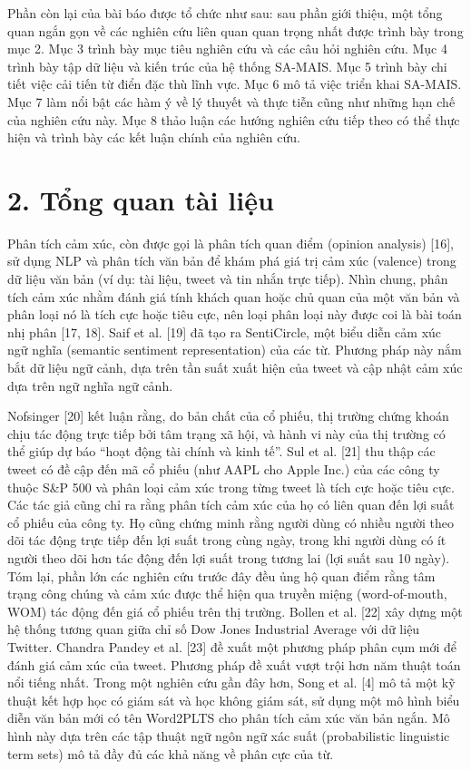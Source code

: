 Phần còn lại của bài báo được tổ chức như sau: sau phần giới thiệu, một tổng quan ngắn gọn về các nghiên cứu liên quan quan trọng nhất được trình bày trong mục 2. Mục 3 trình bày mục tiêu nghiên cứu và các câu hỏi nghiên cứu. Mục 4 trình bày tập dữ liệu và kiến trúc của hệ thống SA-MAIS. Mục 5 trình bày chi tiết việc cải tiến từ điển đặc thù lĩnh vực. Mục 6 mô tả việc triển khai SA-MAIS. Mục 7 làm nổi bật các hàm ý về lý thuyết và thực tiễn cũng như những hạn chế của nghiên cứu này. Mục 8 thảo luận các hướng nghiên cứu tiếp theo có thể thực hiện và trình bày các kết luận chính của nghiên cứu.

\section{2. Tổng quan tài liệu}

Phân tích cảm xúc, còn được gọi là phân tích quan điểm (opinion analysis) [16], sử dụng NLP và phân tích văn bản để khám phá giá trị cảm xúc (valence) trong dữ liệu văn bản (ví dụ: tài liệu, tweet và tin nhắn trực tiếp). Nhìn chung, phân tích cảm xúc nhằm đánh giá tính khách quan hoặc chủ quan của một văn bản và phân loại nó là tích cực hoặc tiêu cực, nên loại phân loại này được coi là bài toán nhị phân [17, 18]. Saif et al. [19] đã tạo ra SentiCircle, một biểu diễn cảm xúc ngữ nghĩa (semantic sentiment representation) của các từ. Phương pháp này nắm bắt dữ liệu ngữ cảnh, dựa trên tần suất xuất hiện của tweet và cập nhật cảm xúc dựa trên ngữ nghĩa ngữ cảnh.

Nofsinger [20] kết luận rằng, do bản chất của cổ phiếu, thị trường chứng khoán chịu tác động trực tiếp bởi tâm trạng xã hội, và hành vi này của thị trường có thể giúp dự báo ``hoạt động tài chính và kinh tế''. Sul et al. [21] thu thập các tweet có đề cập đến mã cổ phiếu (như AAPL cho Apple Inc.) của các công ty thuộc S\&P 500 và phân loại cảm xúc trong từng tweet là tích cực hoặc tiêu cực. Các tác giả cũng chỉ ra rằng phân tích cảm xúc của họ có liên quan đến lợi suất cổ phiếu của công ty. Họ cũng chứng minh rằng người dùng có nhiều người theo dõi tác động trực tiếp đến lợi suất trong cùng ngày, trong khi người dùng có ít người theo dõi hơn tác động đến lợi suất trong tương lai (lợi suất sau 10 ngày). Tóm lại, phần lớn các nghiên cứu trước đây đều ủng hộ quan điểm rằng tâm trạng công chúng và cảm xúc được thể hiện qua truyền miệng (word-of-mouth, WOM) tác động đến giá cổ phiếu trên thị trường. Bollen et al. [22] xây dựng một hệ thống tương quan giữa chỉ số Dow Jones Industrial Average với dữ liệu Twitter. Chandra Pandey et al. [23] đề xuất một phương pháp phân cụm mới để đánh giá cảm xúc của tweet. Phương pháp đề xuất vượt trội hơn năm thuật toán nổi tiếng nhất. Trong một nghiên cứu gần đây hơn, Song et al. [4] mô tả một kỹ thuật kết hợp học có giám sát và học không giám sát, sử dụng một mô hình biểu diễn văn bản mới có tên Word2PLTS cho phân tích cảm xúc văn bản ngắn. Mô hình này dựa trên các tập thuật ngữ ngôn ngữ xác suất (probabilistic linguistic term sets) mô tả đầy đủ các khả năng về phân cực của từ.

